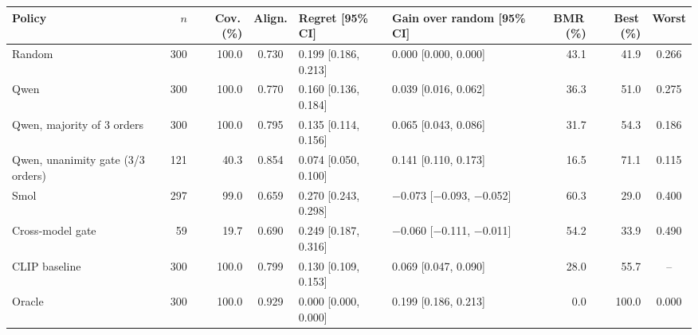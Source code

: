 \begin{tabular}{lrrcllrrc}
\toprule
Policy & $n$ & Cov.\,(\%) & Align. & Regret [95\% CI] & Gain over random [95\% CI] & BMR\,(\%) & Best\,(\%) & Worst\\
\midrule
Random & 300 & 100.0 & 0.730 & 0.199 [0.186, 0.213] & 0.000 [0.000, 0.000] & 43.1 & 41.9 & 0.266\\
Qwen & 300 & 100.0 & 0.770 & 0.160 [0.136, 0.184] & 0.039 [0.016, 0.062] & 36.3 & 51.0 & 0.275\\
Qwen, majority of 3 orders & 300 & 100.0 & 0.795 & 0.135 [0.114, 0.156] & 0.065 [0.043, 0.086] & 31.7 & 54.3 & 0.186\\
Qwen, unanimity gate (3/3 orders) & 121 & 40.3 & 0.854 & 0.074 [0.050, 0.100] & 0.141 [0.110, 0.173] & 16.5 & 71.1 & 0.115\\
Smol & 297 & 99.0 & 0.659 & 0.270 [0.243, 0.298] & $-$0.073 [$-$0.093, $-$0.052] & 60.3 & 29.0 & 0.400\\
Cross-model gate & 59 & 19.7 & 0.690 & 0.249 [0.187, 0.316] & $-$0.060 [$-$0.111, $-$0.011] & 54.2 & 33.9 & 0.490\\
CLIP baseline & 300 & 100.0 & 0.799 & 0.130 [0.109, 0.153] & 0.069 [0.047, 0.090] & 28.0 & 55.7 & --\\
Oracle & 300 & 100.0 & 0.929 & 0.000 [0.000, 0.000] & 0.199 [0.186, 0.213] & 0.0 & 100.0 & 0.000\\
\bottomrule
\end{tabular}
